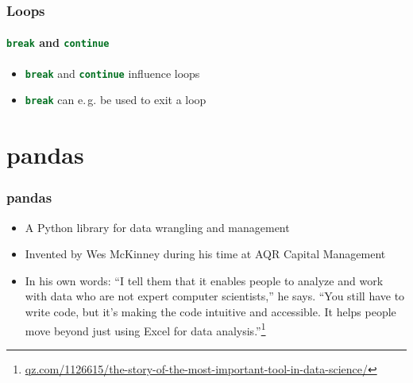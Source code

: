 \documentclass[ngerman]{beamer}
\newcommand{\ta}[1]{\textattachfile[color=1 0 0]{#1}{Code}}
\begin{document}
\begin{frame}[containsverbatim]
\frametitle{Loops}
\framesubtitle{\lstinline[language={Python}]{break} and \lstinline[language={Python}]{continue}}

\begin{itemize}
\item \lstinline[language={Python}]{break} and \lstinline[language={Python}]{continue} influence loops
\item \lstinline[language={Python}]{break} can e.\,g. be used to exit a loop 
\end{itemize}



\end{frame}




\section{pandas}

\begin{frame}
\frametitle{pandas}

\begin{itemize}
	\item A Python library for data wrangling and management
	\item Invented by Wes McKinney during his time at AQR Capital Management
	\item In his own words:
\enquote{I tell them that it enables people to analyze and work with data who are not expert computer scientists,} he says. \enquote{You still have to write code, but it’s making the code intuitive and accessible. It helps people move beyond just using Excel for data analysis.}\footnote{\url{qz.com/1126615/the-story-of-the-most-important-tool-in-data-science/}}
\end{itemize}

\end{frame}
\end{document}
